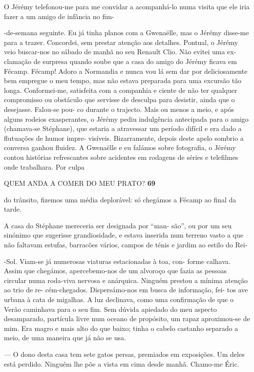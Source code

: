O Jérémy telefonou-me para me convidar a acompanhá-lo numa visita que
ele iria fazer a um amigo de infância no fim-

-de-semana seguinte. Eu já tinha planos com a Gwenaëlle, mas o Jérémy
disse-me para a trazer. Concordei, sem prestar atenção aos detalhes.
Pontual, o Jérémy veio buscar-nos no sábado de manhã no seu Renault
Clio. Não evitei uma ex- clamação de surpresa quando soube que a casa do
amigo do Jérémy ficava em Fécamp. Fécamp! Adoro a Normandia e nunca vou
lá sem dar por deliciosamente bem empregue o meu tempo, mas não estava
preparada para uma excursão tão longa. Conformei-me, satisfeita com a
companhia e ciente de não ter qualquer compromisso ou obstáculo que
servisse de desculpa para desistir, ainda que o desejasse. Falou-se pou-
co durante o trajecto. Mais ou menos a meio, e após alguns rodeios
exasperantes, o Jérémy pediu indulgência antecipada para o amigo
(chamava-se Stéphane), que estaria a atravessar um período difícil e era
dado a flutuações de humor impre- visíveis. Bizarramente, depois deste
apelo sombrio a conversa ganhou fluidez. A Gwenaëlle e eu falámos sobre
fotografia, o Jérémy contou histórias refrescantes sobre acidentes em
rodagens de séries e telefilmes onde trabalhara. Por culpa

QUEM ANDA A COMER DO MEU PRATO? \textbf{69}

do trânsito, fizemos uma média deplorável: só chegámos a Fécamp ao final
da tarde.

A casa do Stéphane mereceria ser designada por ``man- são'', ou por um
seu sinónimo que sugerisse grandiosidade, e estava inserida num terreno
vasto a que não faltavam estufas, barracões vários, campos de ténis e
jardim ao estilo do Rei-

-Sol. Viam-se já numerosas viaturas estacionadas à toa, con- forme
calhava. Assim que chegámos, apercebemo-nos de um alvoroço que fazia as
pessoas circular numa roda-viva nervosa e anárquica. Ninguém prestou a
mínima atenção ao trio de re- cém-chegados. Dispersámo-nos em busca de
informação, fei- tos ave urbana à cata de migalhas. A luz declinava,
como uma confirmação de que o Verão caminhava para o seu fim. Sem dúvida
apiedado do meu aspecto desamparado, partícula livre num oceano de
propósito, um rapaz aproximou-se de mim. Era magro e mais alto do que
baixo; tinha o cabelo castanho separado a meio, de uma maneira que já
não se usa.

--- O dono desta casa tem sete gatos persas, premiados em exposições. Um
deles está perdido. Ninguém lhe põe a vista em cima desde manhã.
Chamo-me Éric.

